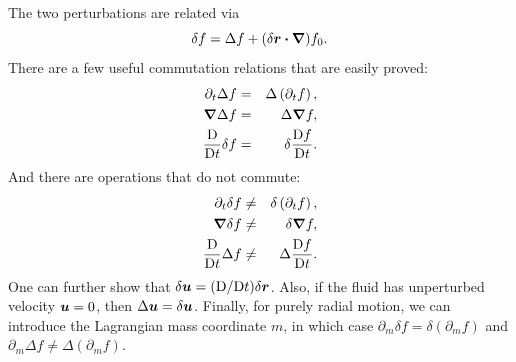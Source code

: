 The two perturbations are related via
\begin{equation}
\delta f = \Delta f + (\delta\boldsymbol{r}\boldsymbol{\cdot}\boldsymbol{\nabla})f_{0}.
\end{equation}
There are a few useful commutation relations that are easily proved:
\begin{eqnarray}
\partial_{t}\Delta f &=& \Delta\left(\partial_{t}f\right),\\
\boldsymbol{\nabla} \Delta f &=& \Delta \boldsymbol{\nabla} f,\\
\frac{\mathrm{D}}{\mathrm{D} t}\delta f &=& \delta \frac{\mathrm{D} f}{\mathrm{D} t}.
\end{eqnarray}
And there are operations that do not commute:
\begin{eqnarray}
\partial_{t}\delta f &\neq& \delta\left(\partial_{t}f\right),\\
\boldsymbol{\nabla} \delta f &\neq& \delta \boldsymbol{\nabla} f,\\
\frac{\mathrm{D}}{\mathrm{D} t}\Delta f &\neq& \Delta \frac{\mathrm{D} f}{\mathrm{D} t}.
\end{eqnarray}
One can further show that $\delta\boldsymbol{u} = (\mathrm{D}/\mathrm{D} t)\delta \boldsymbol{r}$. Also, if the fluid has unperturbed velocity $\boldsymbol{u} = 0$, then $\Delta \boldsymbol{u} = \delta \boldsymbol{u}$.  Finally, for purely radial motion, we can introduce the Lagrangian mass coordinate $m$, in which case $\partial_{m}\delta f = \delta(\partial_{m}f)$ and $\partial_{m}\Delta f \neq \Delta(\partial_{m}f)$.

